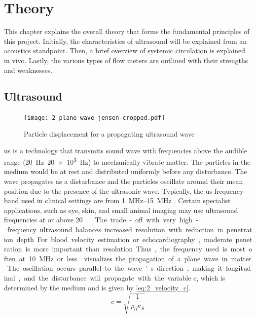 \chapter{Theory} \label{cha:theory} %
This chapter explains the overall theory that forms the fundamental principles of this project. Initially, the characteristics of ultrasound will be explained from an acoustics standpoint. Then, a brief overview of systemic circulation is explained in vivo. Lastly, the various types of flow meters are outlined with their strengths and weaknesses.
\section{Ultrasound}
\begin{figure}[htbp]
	\centering
	\texttt{[image: 2\_plane\_wave\_jensen-cropped.pdf]}
	\caption[Particle displacement for a propagating ultrasound wave]{Particle displacement for a propagating ultrasound wave \cite{JensenUltrasoundBook}}
	\label{fig:2_planewave_jensen}
\end{figure}
\gls{us} is a technology that transmits sound wave with frequencies above the audible range (\qtyrange[range-units = single]{20}{20e3}{\hertz}) to mechanically vibrate matter. The particles in the medium would be at rest and distributed uniformly before any disturbance. The wave propagates as a disturbance and the particles oscillate around their mean position due to the presence of the ultrasonic wave. Typically, the \gls{us} frequency-band used in clinical settings are from \qtyrange[range-units = single]{1}{15}{\mega\hertz} \cite{Szabo_UltrasoundBook_2}. Certain specialist applications, such as eye, skin, and small animal imaging may use ultrasound frequencies at or above \qty{20}{\mega\hertz.} \cite{Winckler2012}. The trade-off with very high-frequency ultrasound balances increased resolution with reduction in penetration depth. For blood velocity estimation or echocardiography, moderate penetration is more important than resolution. Thus, the frequency used is most often at \qty{10}{\mega\hertz} or less.  visualizes the propagation of a plane wave in matter. The oscillation occurs parallel to the wave's direction, making it longitudinal, and the disturbance will propagate with the variable $c$, which is determined by the medium and is given by \cref{eq:2_velocity_c}.
\begin{equation} \label{eq:2_velocity_c}
	c = \sqrt{\frac{1}{\rho_{0} \kappa_{S}}}
\end{equation}
